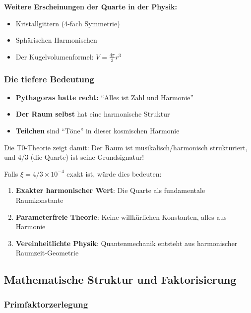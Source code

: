 \documentclass[12pt,a4paper]{article}
\newcommand{\xipar}{\ensuremath{\xi}}
\newcommand{\mypi}{\ensuremath{\pi}}
\newcommand{\mytimes}{\ensuremath{\times}}
\begin{document}
	\textbf{Weitere Erscheinungen der Quarte in der Physik:}
	\begin{itemize}
		\item Kristallgittern (4-fach Symmetrie)
		\item Sphärischen Harmonischen
		\item Der Kugelvolumenformel: $V = \frac{4\mypi}{3}r^3$
	\end{itemize}
	
	\subsubsection{Die tiefere Bedeutung}
	\label{subsubsec:tiefere_bedeutung}
	
	\begin{tcolorbox}[colback=green!5!white,colframe=green!75!black,title=Die pythagoreische Wahrheit]
		\begin{itemize}
			\item \textbf{Pythagoras hatte recht:} ``Alles ist Zahl und Harmonie''
			\item \textbf{Der Raum selbst} hat eine harmonische Struktur
			\item \textbf{Teilchen} sind ``Töne'' in dieser kosmischen Harmonie
		\end{itemize}
	\end{tcolorbox}
	
	Die T0-Theorie zeigt damit: Der Raum ist musikalisch/harmonisch strukturiert, und 4/3 (die Quarte) ist seine Grundsignatur!
	
	Falls $\xipar = 4/3 \mytimes 10^{-4}$ exakt ist, würde dies bedeuten:
	\begin{enumerate}
		\item \textbf{Exakter harmonischer Wert}: Die Quarte als fundamentale Raumkonstante
		\item \textbf{Parameterfreie Theorie}: Keine willkürlichen Konstanten, alles aus Harmonie
		\item \textbf{Vereinheitlichte Physik}: Quantenmechanik entsteht aus harmonischer Raumzeit-Geometrie
	\end{enumerate}
	
	\subsection{Mathematische Struktur und Faktorisierung}
	\label{subsec:mathematische_struktur}
	
	\subsubsection{Primfaktorzerlegung}
	\label{subsubsec:primfaktorzerlegung}
	
\end{document}
